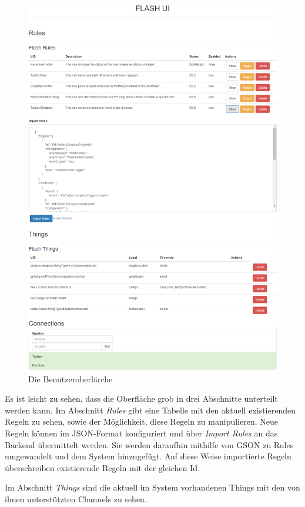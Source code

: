 \begin{figure}
	\centering
	\includegraphics[width=\textwidth]{bilder/gui_all4}
	\caption{Die Benutzeroberlärche}
	\label{fig:gui_all}
\end{figure}

Es ist leicht zu sehen, dass die Oberfläche grob in drei Abschnitte unterteilt werden kann. Im Abschnitt \textit{Rules} gibt eine Tabelle mit den aktuell existierenden Regeln zu sehen, sowie der Möglichkeit, diese Regeln zu manipulieren. Neue Regeln können im JSON-Format konfiguriert und über \textit{Import Rules} an das Backend übermittelt werden. Sie werden daraufhin mithilfe von GSON\cite{gson} zu Rules umgewandelt und dem System hinzugefügt. Auf diese Weise importierte Regeln überschreiben existierende Regeln mit der gleichen Id.

Im Abschnitt \textit{Things} sind die aktuell im System vorhandenen Things mit den von ihnen unterstützten Channels zu sehen. 

